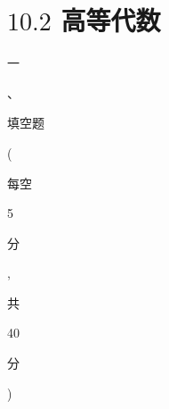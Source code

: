 \documentclass[10pt]{article}
\begin{document}
\section{$10.2$ 高等代数}
\begin{CJK}{UTF8}{mj}一\end{CJK}、\begin{CJK}{UTF8}{mj}填空题\end{CJK} (\begin{CJK}{UTF8}{mj}每空\end{CJK} 5 \begin{CJK}{UTF8}{mj}分\end{CJK}, \begin{CJK}{UTF8}{mj}共\end{CJK} 40 \begin{CJK}{UTF8}{mj}分\end{CJK})
\end{document}
